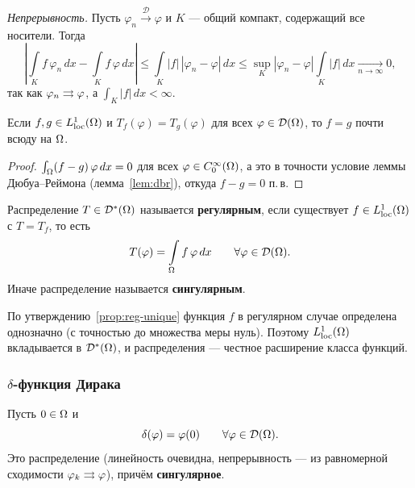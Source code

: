 \emph{Непрерывность.} Пусть $\varphi_n \xrightarrow{\mathcal{D}} \varphi$ и $K$ — общий
компакт, содержащий все носители. Тогда
\[
  \left| \int\limits_K f\,\varphi_n\, dx - \int\limits_K f\,\varphi\, dx \right|
  \le \int\limits_K |f|\,|\varphi_n - \varphi|\, dx
  \le \sup_K |\varphi_n - \varphi| \int\limits_K |f|\, dx \xrightarrow[n \to \infty]{} 0 ,
\]
так как $\varphi_n \rightrightarrows \varphi$, а $\int_K |f|\,dx < \infty$.

\begin{proposition}\label{prop:reg-unique}
Если $f, g \in L^1_{\mathrm{loc}}(\Omega)$ и $T_f(\varphi) = T_g(\varphi)$ для всех
$\varphi \in \mathcal{D}(\Omega)$, то $f = g$ почти всюду на $\Omega$.
\end{proposition}

\begin{proof}
$\int_\Omega (f-g)\,\varphi\, dx = 0$ для всех $\varphi \in C_0^\infty(\Omega)$, а это в точности
условие леммы Дюбуа--Реймона (лемма~\ref{lem:dbr}), откуда $f - g = 0$ п.\,в.
\end{proof}

\begin{definition}
Распределение $T \in \mathcal{D}^*(\Omega)$ называется \textbf{регулярным}, если существует
$f \in L^1_{\mathrm{loc}}(\Omega)$ с $T = T_f$, то есть
\[
  T(\varphi) = \int\limits_\Omega f\,\varphi\, dx \qquad \forall \varphi \in \mathcal{D}(\Omega) .
\]
Иначе распределение называется \textbf{сингулярным}.
\end{definition}

\begin{idea}
По утверждению~\ref{prop:reg-unique} функция $f$ в регулярном случае определена
однозначно (с точностью до множества меры нуль). Поэтому $L^1_{\mathrm{loc}}(\Omega)$ вкладывается
в $\mathcal{D}^*(\Omega)$, и распределения — честное расширение класса функций.
\end{idea}

\subsubsection*{$\delta$-функция Дирака}

\begin{example}\label{ex:delta}
Пусть $0 \in \Omega$ и
\[
  \delta(\varphi) = \varphi(0) \qquad \forall \varphi \in \mathcal{D}(\Omega) .
\]
Это распределение (линейность очевидна, непрерывность — из равномерной сходимости
$\varphi_k \rightrightarrows \varphi$), причём \textbf{сингулярное}.
\end{example}


